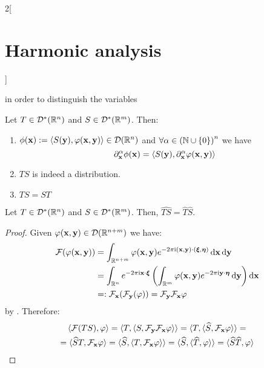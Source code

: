 \documentclass[../../../main_math.tex]{subfiles}
\begin{document}
\begin{multicols}{2}[\section{Harmonic analysis}]
\begin{definition}
    in order to distinguish the variables
  \end{definition}
  \begin{lemma}
    Let $T\in \mathcal{D}^*(\mathbb{R}^n)$ and $S\in \mathcal{D}^*(\mathbb{R}^m)$. Then:
    \begin{enumerate}
      \item $\phi(\boldsymbol{\mathrm{x}}):=\langle S(\boldsymbol{\mathrm{y}}), \varphi(\boldsymbol{\mathrm{x}},\boldsymbol{\mathrm{y}})\rangle\in \mathcal{D}(\mathbb{R}^n)$ and $\forall \alpha\in{(\ensuremath{\mathbb{N}}\cup\{0\})}^n$ we have $$\partial_{\boldsymbol{\mathrm{x}}}^\alpha\phi(\boldsymbol{\mathrm{x}})=\langle S(\boldsymbol{\mathrm{y}}), \partial_{\boldsymbol{\mathrm{x}}}^\alpha\varphi(\boldsymbol{\mathrm{x}},\boldsymbol{\mathrm{y}})\rangle$$
      \item $TS$ is indeed a distribution.
      \item $TS=ST$
    \end{enumerate}
  \end{lemma}
  \begin{proposition}
    Let $T\in \mathcal{D}^*(\mathbb{R}^n)$ and $S\in \mathcal{D}^*(\mathbb{R}^m)$. Then, $\widehat{TS}=\widehat{T}\widehat{S}$.
  \end{proposition}
  \begin{proof}
    Given $\varphi(\boldsymbol{\mathrm{x}},\boldsymbol{\mathrm{y}})\in \mathcal{D}(\mathbb{R}^{n+m})$ we have:
    \begin{align*}
      \mathcal{F}(\varphi(\boldsymbol{\mathrm{x}},\boldsymbol{\mathrm{y}})) & =\int_{\mathbb{R}^{n+m}}\varphi(\boldsymbol{\mathrm{x}},\boldsymbol{\mathrm{y}})e^{-2\pi\mathrm{i}(\boldsymbol{\mathrm{x}},\boldsymbol{\mathrm{y}})\cdot(\boldsymbol{\mathrm{\xi}},\boldsymbol{\mathrm{\eta}})}\dd{\boldsymbol{\mathrm{x}}}\dd{\boldsymbol{\mathrm{y}}}                                      \\
                                 & = \int_{\mathbb{R}^{n}}e^{-2\pi\mathrm{i}\boldsymbol{\mathrm{x}}\cdot\boldsymbol{\mathrm{\xi}}}\left(\int_{\mathbb{R}^{m}}\varphi(\boldsymbol{\mathrm{x}},\boldsymbol{\mathrm{y}})e^{-2\pi\mathrm{i}\boldsymbol{\mathrm{y}}\cdot\boldsymbol{\mathrm{\eta}}}\dd{\boldsymbol{\mathrm{y}}}\right)\dd{\boldsymbol{\mathrm{x}}} \\
                                 & =:\mathcal{F}_{\boldsymbol{\mathrm{x}}}(\mathcal{F}_{\boldsymbol{\mathrm{y}}}(\varphi))=\mathcal{F}_{\boldsymbol{\mathrm{y}}}\mathcal{F}_{\boldsymbol{\mathrm{x}}}\varphi
    \end{align*}
    by .
    Therefore:
    \begin{multline*}
      \langle \mathcal{F}(TS),\varphi\rangle=\langle T,\langle S,\mathcal{F}_{\boldsymbol{\mathrm{y}}}\mathcal{F}_{\boldsymbol{\mathrm{x}}}\varphi\rangle\rangle= \langle T,\langle \widehat{S}, \mathcal{F}_{\boldsymbol{\mathrm{x}}}\varphi\rangle\rangle=\\=\langle \widehat{S}T, \mathcal{F}_{\boldsymbol{\mathrm{x}}}\varphi \rangle=\langle \widehat{S}, \langle T, \mathcal{F}_{\boldsymbol{\mathrm{x}}}\varphi \rangle\rangle=\langle \widehat{S}, \langle \widehat{T}, \varphi \rangle\rangle=\langle \widehat{S}\widehat{T}, \varphi \rangle
    \end{multline*}
  \end{proof}

\end{multicols}
\end{document}
